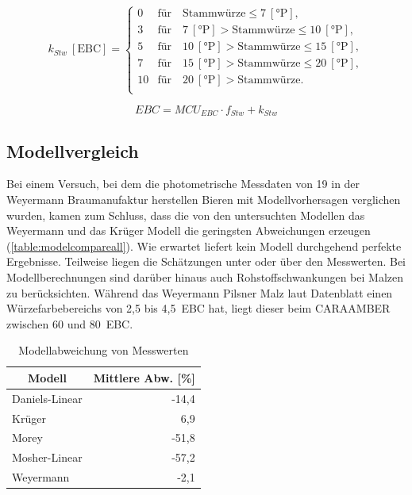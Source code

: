 \documentclass[a4paper,parskip=half]{scrartcl}
\newcommand{\MCUEBC}{\mathit{MCU}_{EBC}}
\newcommand{\EBC}{\mathit{EBC}}
\newcommand{\uebc}{\:[\textrm{EBC}]}
\newcommand{\uplato}{\:[\textrm{°P}]}
\newcommand{\fstw}{f_{Stw}}
\newcommand{\kstw}{k_{Stw}}
\begin{document}
\begin{equation}
\kstw \uebc = \begin{cases}
0  & \text{für} \quad \text{Stammwürze} \le 7 \uplato, \\
3  & \text{für} \quad 7 \uplato > \text{Stammwürze} \le 10 \uplato, \\
5  & \text{für} \quad 10 \uplato > \text{Stammwürze} \le 15 \uplato, \\
7  & \text{für} \quad 15 \uplato > \text{Stammwürze} \le 20 \uplato, \\
10 & \text{für} \quad 20 \uplato > \text{Stammwürze}. \\
\end{cases}
\label{eq:weyermannkstw}
\end{equation}

\begin{equation}
\EBC = \MCUEBC \cdot \fstw + \kstw
\label{eq:ebcweyermann}
\end{equation}

\subsection*{Modellvergleich}

Bei einem Versuch, bei dem die photometrische Messdaten von 19 in der Weyermann Braumanufaktur herstellen Bieren mit Modellvorhersagen verglichen wurden, kamen \textcite{KrausWeyermann2021b} zum Schluss, dass die von den untersuchten Modellen das Weyermann und das Krüger Modell die geringsten Abweichungen erzeugen (\autoref{table:modelcompareall}). Wie erwartet liefert kein Modell durchgehend perfekte Ergebnisse. Teilweise liegen die Schätzungen unter oder über den Messwerten. Bei Modellberechnungen sind darüber hinaus auch Rohstoffschwankungen bei Malzen zu berücksichten. Während das Weyermann Pilsner Malz laut Datenblatt einen Würzefarbebereichs von 2,5 bis 4,5~EBC hat, liegt dieser beim CARAAMBER zwischen 60 und 80~EBC.

\begin{table}[H]
\centering
\begin{tabular}{lr}
\toprule
\multicolumn{1}{c}{\textbf{Modell}} & \multicolumn{1}{c}{\textbf{Mittlere Abw. [\%]}} \\
\midrule
Daniels-Linear & -14,4 \\
Krüger & 6,9 \\
Morey & -51,8 \\
Mosher-Linear & -57,2 \\
Weyermann & -2,1 \\
\bottomrule
\end{tabular}
\caption{Modellabweichung von Messwerten \parencite{KrausWeyermann2021b}}
\label{table:modelcompareall}
\end{table}
\end{document}
